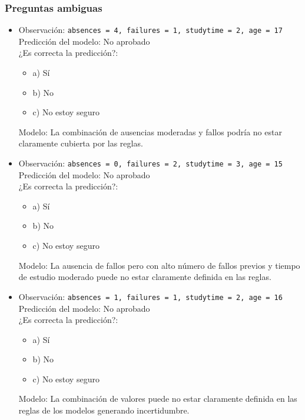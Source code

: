 \subsubsection*{Preguntas ambiguas}
\begin{itemize}
    \item Observación: \texttt{absences = 4, failures = 1, studytime = 2, age = 17}\\
    Predicción del modelo: No aprobado\\
    ¿Es correcta la predicción?:
    \begin{itemize}
        \item a) Sí
        \item b) No
        \item c) No estoy seguro
    \end{itemize}
    Modelo: La combinación de ausencias moderadas y fallos podría no estar claramente cubierta por las reglas.

    \item Observación: \texttt{absences = 0, failures = 2, studytime = 3, age = 15}\\
    Predicción del modelo: No aprobado\\
    ¿Es correcta la predicción?:
    \begin{itemize}
        \item a) Sí
        \item b) No
        \item c) No estoy seguro
    \end{itemize}
    Modelo: La ausencia de fallos pero con alto número de fallos previos y tiempo de estudio moderado puede no estar claramente definida en las reglas.

    \item Observación: \texttt{absences = 1, failures = 1, studytime = 2, age = 16}\\
    Predicción del modelo: No aprobado\\
    ¿Es correcta la predicción?:
    \begin{itemize}
        \item a) Sí
        \item b) No
        \item c) No estoy seguro
    \end{itemize}
    Modelo: La combinación de valores puede no estar claramente definida en las reglas de los modelos generando incertidumbre.
\end{itemize}

